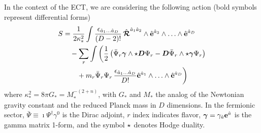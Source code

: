 \documentclass[twocolumn,showpacs,showkeys,prd,superscriptaddress]{revtex4-1}
\begin{document}

In the context of the ECT, we are considering the following action (bold symbols represent differential forms)
\begin{align}
  \nonumber
  S &= \frac{1}{2\kappa_*^2}\int\frac{\epsilon_{\hat{a}_1\ldots\hat{a}_D}}{(D-2)!}\,\hat{{\boldsymbol{\mathcal{R}}}}^{\hat{a}_1\hat{a}_2}\wedge\hat{{\bf{e}}}^{\hat{a}_3}\wedge\ldots\wedge\hat{{\bf{e}}}^{\hat{a}_D} \\
  \nonumber
  &\quad- \sum_{r}\int\bigg(\frac{1}{2}\left(\bar{\Psi}_r{\boldsymbol{\gamma}}\wedge\star{\boldsymbol{D}}\Psi_r - {\boldsymbol{D}}\bar{\Psi}_r\wedge\star{\boldsymbol{\gamma}}\Psi_r\right) \\
  \label{formaction}
  &\qquad + m_r \bar{\Psi}_r\Psi_r\,\frac{\epsilon_{\hat{a}_1\ldots\hat{a}_D}}{D!}\hat{{\bf{e}}}^{\hat{a}_1}\wedge\ldots\wedge\hat{{\bf{e}}}^{\hat{a}_D}\bigg)
\end{align}
where $\kappa_*^2 = 8\pi G_* = M_*^{-(2+n)}$, with $G_*$ and $M_*$  the analog of the Newtonian gravity constant and the reduced Planck mass in $D$ dimensions. In the fermionic sector, $\bar{\Psi}\equiv\imath\Psi^\dagger\gamma^0$ is the Dirac adjoint,  $r$ index indicates flavor, \mbox{${\boldsymbol{\gamma}}=\gamma_{\hat{a}}{\bf{e}}^{\hat{a}}$} is the gamma matrix 1-form, and the symbol $\star$ denotes Hodge duality.
\end{document}
